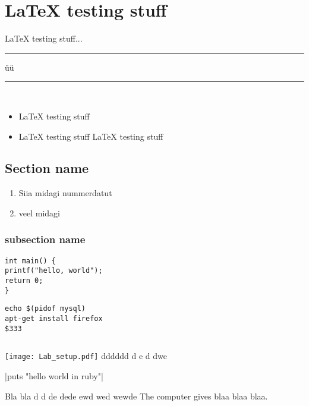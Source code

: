 \chapter{LaTeX testing stuff}
\label{LaTeX testing stuff}
LaTeX testing stuff...
\rule{2.6cm}{0.75pt}  \hspace{3cm} üü \rule{3cm}{0.75pt}\\[2cm]
\begin{itemize}
	\item LaTeX testing stuff
	\item LaTeX testing stuff LaTeX testing stuff
\end{itemize}


\section{Section name}
\begin{enumerate}
	\item Siia midagi nummerdatut
	\item veel midagi
\end{enumerate}
\subsection{subsection name}


\begin{verbatim}
int main() {
printf("hello, world");
return 0;
}
\end{verbatim}
\begin{verbatim}
echo $(pidof mysql)
apt-get install firefox
$333
\end{verbatim}
\inputminted{sh}{code/simple.sh}

\texttt{[image: Lab\_setup.pdf]}
dddddd d  e d dwe \

|puts "hello world in ruby"|\

\cite{website:ssl} Bla bla
\citep{book:code-complete} d  d
\citep{OppeArenduskeskus2010} de dede
\cite{url:pulse} ewd wed
\citep{SecEngineering} wewde
The \gls{computer} gives blaa blaa blaa.
